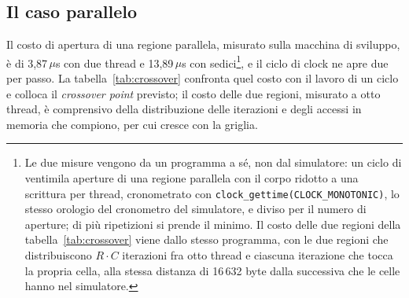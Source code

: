 \subsection{Il caso parallelo}
\label{sec:parallelo}

Il costo di apertura di una regione parallela,
misurato sulla macchina di sviluppo, è di 3,87\,$\mu$s con due
thread e 13,89\,$\mu$s con sedici\footnote{Le due misure vengono da un
programma a sé, non dal simulatore: un ciclo di ventimila aperture di una
regione parallela con il corpo ridotto a una scrittura per thread, cronometrato
con \texttt{clock\_gettime(CLOCK\_MONOTONIC)}, lo stesso orologio del
cronometro del simulatore, e diviso per il numero di aperture; di più
ripetizioni si prende il minimo. Il costo delle due regioni della
tabella~\ref{tab:crossover} viene dallo stesso programma, con le due regioni
che distribuiscono $R \cdot C$ iterazioni fra otto thread e ciascuna
iterazione che tocca la propria cella, alla stessa distanza di 16\,632 byte
dalla successiva che le celle hanno nel simulatore.}, e il ciclo di clock ne
apre due per passo. La
tabella~\ref{tab:crossover} confronta quel costo con il lavoro di un ciclo e
colloca il \emph{crossover point} previsto; il costo delle due regioni, misurato a otto
thread, è comprensivo della distribuzione delle iterazioni e degli accessi in
memoria che compiono, per cui cresce con la griglia.

